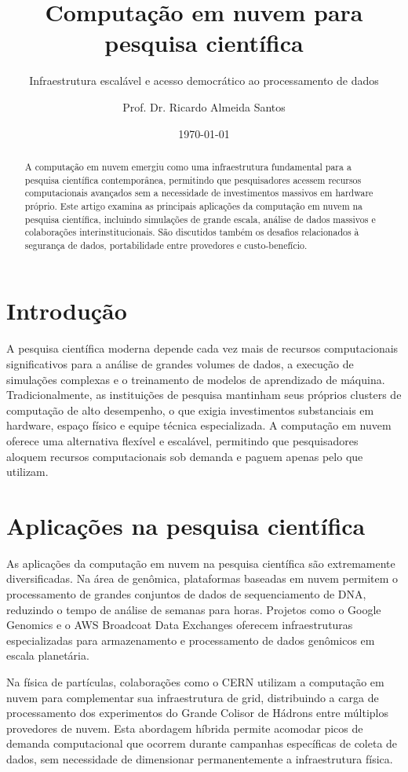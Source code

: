 \documentclass[
    language=portuguese,
    doctype=article,
]{../../omnilatex}
\title{Computação em nuvem para pesquisa científica}
\subtitle{Infraestrutura escalável e acesso democrático ao processamento de dados}
\author{Prof. Dr. Ricardo Almeida Santos}
\date{\today}
\begin{document}
\maketitle

\begin{abstract}
A computação em nuvem emergiu como uma infraestrutura fundamental para a pesquisa científica contemporânea, permitindo que pesquisadores acessem recursos computacionais avançados sem a necessidade de investimentos massivos em hardware próprio. Este artigo examina as principais aplicações da computação em nuvem na pesquisa científica, incluindo simulações de grande escala, análise de dados massivos e colaborações interinstitucionais. São discutidos também os desafios relacionados à segurança de dados, portabilidade entre provedores e custo-benefício.
\end{abstract}

\section{Introdução}
A pesquisa científica moderna depende cada vez mais de recursos computacionais significativos para a análise de grandes volumes de dados, a execução de simulações complexas e o treinamento de modelos de aprendizado de máquina. Tradicionalmente, as instituições de pesquisa mantinham seus próprios clusters de computação de alto desempenho, o que exigia investimentos substanciais em hardware, espaço físico e equipe técnica especializada. A computação em nuvem oferece uma alternativa flexível e escalável, permitindo que pesquisadores aloquem recursos computacionais sob demanda e paguem apenas pelo que utilizam.

\section{Aplicações na pesquisa científica}
As aplicações da computação em nuvem na pesquisa científica são extremamente diversificadas. Na área de genômica, plataformas baseadas em nuvem permitem o processamento de grandes conjuntos de dados de sequenciamento de DNA, reduzindo o tempo de análise de semanas para horas. Projetos como o Google Genomics e o AWS Broadcoat Data Exchanges oferecem infraestruturas especializadas para armazenamento e processamento de dados genômicos em escala planetária.

Na física de partículas, colaborações como o CERN utilizam a computação em nuvem para complementar sua infraestrutura de grid, distribuindo a carga de processamento dos experimentos do Grande Colisor de Hádrons entre múltiplos provedores de nuvem. Esta abordagem híbrida permite acomodar picos de demanda computacional que ocorrem durante campanhas específicas de coleta de dados, sem necessidade de dimensionar permanentemente a infraestrutura física.
\end{document}

